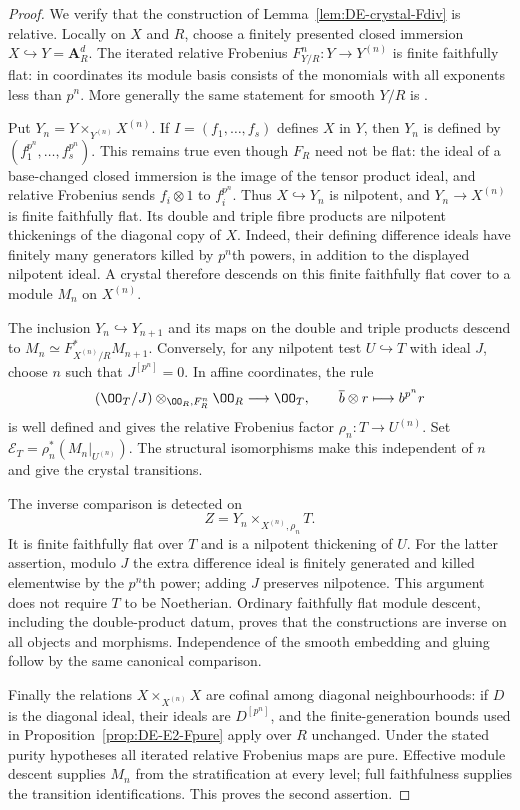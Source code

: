 \begin{proof}
We verify that the construction of Lemma~\ref{lem:DE-crystal-Fdiv} is relative.  Locally on $X$ and $R$, choose a finitely presented closed immersion $X\hookrightarrow Y=\mathbf A_R^d$.  The iterated relative Frobenius $F_{Y/R}^n:Y\to Y^{(n)}$ is finite faithfully flat: in coordinates its module basis consists of the monomials with all exponents less than $p^n$.  More generally the same statement for smooth $Y/R$ is \cite[Lemma~50.19.5, Tag~0FW2]{StacksProject}.

Put $Y_n=Y\times_{Y^{(n)}}X^{(n)}$.  If $I=(f_1,\ldots,f_s)$ defines $X$ in $Y$, then $Y_n$ is defined by $(f_1^{p^n},\ldots,f_s^{p^n})$.  This remains true even though $F_R$ need not be flat: the ideal of a base-changed closed immersion is the image of the tensor product ideal, and relative Frobenius sends $f_i\otimes1$ to $f_i^{p^n}$.  Thus $X\hookrightarrow Y_n$ is nilpotent, and $Y_n\to X^{(n)}$ is finite faithfully flat.  Its double and triple fibre products are nilpotent thickenings of the diagonal copy of $X$.  Indeed, their defining difference ideals have finitely many generators killed by $p^n$th powers, in addition to the displayed nilpotent ideal.  A crystal therefore descends on this finite faithfully flat cover to a module $M_n$ on $X^{(n)}$.

The inclusion $Y_n\hookrightarrow Y_{n+1}$ and its maps on the double and triple products descend to $M_n\simeq F_{X^{(n)}/R}^*M_{n+1}$.  Conversely, for any nilpotent test $U\hookrightarrow T$ with ideal $J$, choose $n$ such that $J^{[p^n]}=0$.  In affine coordinates, the rule
\[
 (\OO_T/J)\otimes_{\OO_R,F_R^n}\OO_R
        \longrightarrow\OO_T,
       \qquad \overline b\otimes r\longmapsto b^{p^n}r
\]
is well defined and gives the relative Frobenius factor $\rho_n:T\to U^{(n)}$.  Set $\mathcal E_T=\rho_n^*(M_n|_{U^{(n)}})$.  The structural isomorphisms make this independent of $n$ and give the crystal transitions.

The inverse comparison is detected on
\[
                 Z=Y_n\times_{X^{(n)},\rho_n}T.
\]
It is finite faithfully flat over $T$ and is a nilpotent thickening of $U$.  For the latter assertion, modulo $J$ the extra difference ideal is finitely generated and killed elementwise by the $p^n$th power; adding $J$ preserves nilpotence.  This argument does not require $T$ to be Noetherian.  Ordinary faithfully flat module descent, including the double-product datum, proves that the constructions are inverse on all objects and morphisms.  Independence of the smooth embedding and gluing follow by the same canonical comparison.

Finally the relations $X\times_{X^{(n)}}X$ are cofinal among diagonal neighbourhoods: if $D$ is the diagonal ideal, their ideals are $D^{[p^n]}$, and the finite-generation bounds used in Proposition~\ref{prop:DE-E2-Fpure} apply over $R$ unchanged.  Under the stated purity hypotheses all iterated relative Frobenius maps are pure.  Effective module descent \cite[Theorem~35.4.22, Tag~08WE]{StacksProject} supplies $M_n$ from the stratification at every level; full faithfulness supplies the transition identifications.  This proves the second assertion.
\end{proof}


